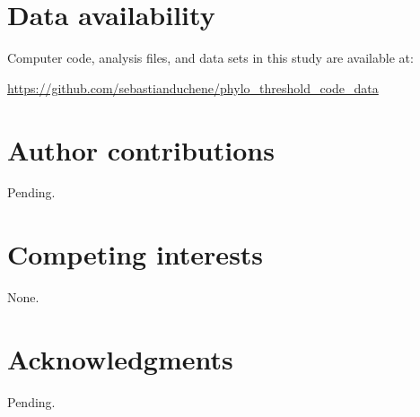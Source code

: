 \documentclass[11pt]{article}
\begin{document}
\section{Data availability}
Computer code, analysis files, and data sets in this study are available at:

\url{https://github.com/sebastianduchene/phylo_threshold_code_data}

\section{Author contributions}
Pending.

\section{Competing interests}
None.


\section{Acknowledgments}
Pending.



%

\end{document}

